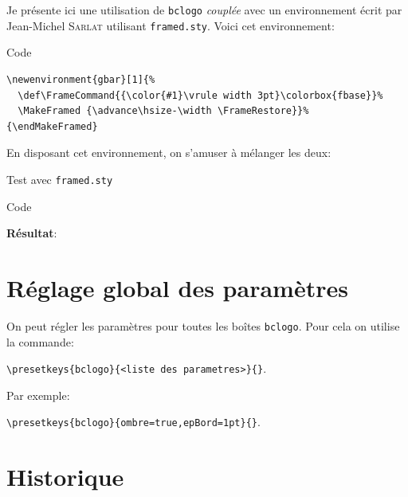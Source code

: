 \documentclass[a4paper,10pt,frenchb]{article}
\newenvironment{gbar}[1]{%
  \def\FrameCommand{{\color{#1}\vrule width 3pt}\colorbox{fbase}}%
  \MakeFramed{\advance\hsize-\width\FrameRestore}}%
{\endMakeFramed}%
\newenvironment*{Code}{%
  \begin{bclogo}[margeG=1,logo=\bccrayon,couleurBarre=Gray,barre=wave,noborder]{Code}%
}%
{%
\end{bclogo}
}%
\newenvironment*{demo}{%
\VerbatimOut{toto.txt}%
}%
{%
\endVerbatimOut%
\begin{bclogo}[margeG=1,logo=\bccrayon,couleurBarre=Gray,barre=wave,noborder]{Code}%
\begin{footnotesize}%
%
\end{footnotesize}%
\end{bclogo}%
\noindent\textbf{Résultat}:\par\smallskip
%
}%
\newcommand*\cmd{\color{Maroon}}%
\begin{document}
Je présente ici une utilisation de \texttt{bclogo} \emph{couplée} avec
un environnement écrit par Jean-Michel \textsc{Sarlat} utilisant
\texttt{framed.sty}. Voici cet environnement:

\begin{Code}
\begin{lstlisting}
\newenvironment{gbar}[1]{%
  \def\FrameCommand{{\color{#1}\vrule width 3pt}\colorbox{fbase}}%
  \MakeFramed {\advance\hsize-\width \FrameRestore}}%
{\endMakeFramed}
\end{lstlisting}
\end{Code}

En disposant cet environnement, on s'amuser à mélanger les deux:

\begin{demo}
\begin{bclogo}[logo=\bcinfo,barre=none,noborder=true]{Test avec \texttt{framed.sty}}%
\begin{gbar}{yellow}
  \lipsum[1]
\end{gbar}
\end{bclogo}
\end{demo}

\section{Réglage global des paramètres}

On peut régler les paramètres pour toutes les boîtes \texttt{bclogo}. Pour cela
on utilise la commande:

\hfil{\cmd\verb|\presetkeys{bclogo}{<liste des parametres>}{}|}.\hfil

Par exemple:

\hfil{\cmd\verb|\presetkeys{bclogo}{ombre=true,epBord=1pt}{}|}.\hfil


\section{Historique}
\end{document}

